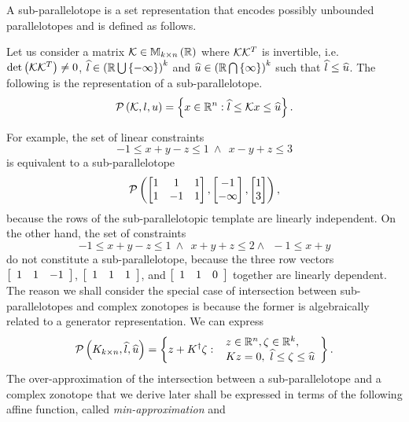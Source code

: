 A sub-parallelotope is a set representation that encodes possibly
unbounded parallelotopes and is defined as follows.
%
\begin{definition}
Let us consider a matrix $\mathcal{K}\in\mathbb{M}_{k\times n}\left(\mathbb{R}\right)$ where
$\mathcal{K}{\mathcal{K}}^T$ is invertible,
i.e. $\operatorname{det}\left(\mathcal{K}{\mathcal{K}}^T\right)\neq 0$,
$\widehat{l}\in\left(\mathbb{R}\bigcup\left\{-\infty\right\}\right)^k$ and
$\widehat{u}\in\left(\mathbb{R}\bigcap\left\{\infty\right\}\right)^k$ such that $\widehat{l}\leq\widehat{u}$.
The following is the representation of a sub-parallelotope.
%
\[
\mathcal{P}\left(\mathcal{K},l,u\right) = \left\{x\in\mathbb{R}^n: \widehat{l}\leq\mathcal{K} x\leq\widehat{u}\right\}.
\]
%
\end{definition}
%
For example, the set of linear constraints
%
\[ -1\leq x+y-z\leq
1~\wedge~~ x-y+z\leq 3\]
%
is equivalent to a sub-parallelotope
$$\mathcal{P}\left(\left[\begin{matrix}1 & 1 & 1\\1 &-1 & 1\end{matrix}\right],\left[\begin{matrix}-1\\-\infty\end{matrix}\right],\left[\begin{matrix}1\\3\end{matrix}\right]\right),$$
because the rows of the sub-parallelotopic template are linearly
independent.  On the other hand, the set of constraints
%
\[
-1\leq
x+y-z\leq 1~\wedge~~x+y+z\leq 2\wedge~~-1\leq x+y
\]
%
do not constitute a sub-parallelotope, because the three row vectors
$\left[\begin{array}{c c c}1 & 1 & -1\end{array}\right]$,
$\left[\begin{array}{c c c}1 & 1 & 1\end{array}\right]$, and
$\left[\begin{array}{c c c}1 & 1 & 0\end{array}\right]$ together are
linearly dependent.  The reason we shall consider the special case of
intersection between sub-parallelotopes and complex zonotopes is
because the former is algebraically related to a generator
representation.  We can express %
\[
\mathcal{P}\left(K_{k\times
    n},\widehat{l},\widehat{u}\right)=\left\{z+{K}^\dagger\zeta:\begin{array}{l}~z\in\mathbb{R}^n,\zeta\in\mathbb{R}^k,
  \\~Kz=0,~\widehat{l}\leq
\zeta\leq \widehat{u}\end{array}\right\}.
\]
%
The over-approximation of the intersection between a sub-parallelotope
and a complex zonotope that we derive later shall be expressed in
terms of the following affine function, called \emph{min-approximation} and
